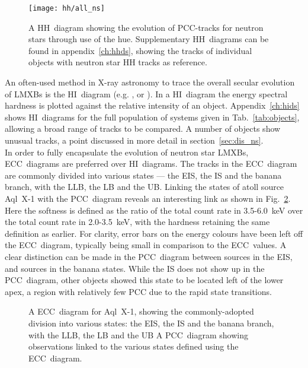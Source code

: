 \begin{figure}[p]
	\myfloatalign
	{\texttt{[image: hh/all\_ns]}}
	\caption[Neutron stars in a \acs{HH}~diagram]{A \ac{HH}~diagram showing the evolution of \ac{PCC}-tracks for neutron stars through use of the hue. Supplementary \ac{HH}~diagrams can be found in appendix~\ref{ch:hhds}, showing the tracks of individual objects with neutron star \ac{HH} tracks as reference.}\label{fig:hh_all_ns}
\end{figure}

An often-used method in X-ray astronomy to trace the overall secular evolution of \acp{LMXB} is the \ac{HI}~diagram (e.g. \citet{done2003observing}, \citet{klein2008identification} or \citet{fridriksson2015common}). In a \ac{HI}~diagram the energy spectral hardness is plotted against the relative intensity of an object. Appendix~\ref{ch:hids} shows \ac{HI}~diagrams for the full population of systems given in Tab.~\ref{tab:objects}, allowing a broad range of tracks to be compared. A number of objects show unusual tracks, a point discussed in more detail in section~\ref{sec:dis_ns}.\\

In order to fully encapsulate the evolution of neutron star \acp{LMXB}, \ac{ECC}~diagrams are preferred over \ac{HI}~diagrams. The tracks in the \ac{ECC}~diagram are commonly divided into various states --- the \ac{EIS}, the \ac{IS} and the banana branch, with the \ac{LLB}, the \ac{LB} and the \ac{UB}. Linking the states of atoll source Aql~X-1 with the \ac{PCC}~diagram reveals an interesting link as shown in Fig.~\ref{fig:cc}. Here the softness is defined as the ratio of the total count rate in 3.5-6.0~keV over the total count rate in 2.0-3.5~keV, with the hardness retaining the same definition as earlier. For clarity, error bars on the energy colours have been left off the \ac{ECC}~diagram, typically being small in comparison to the \ac{ECC}~values. A clear distinction can be made in the \ac{PCC}~diagram between sources in the \ac{EIS}, and sources in the banana states. While the \ac{IS} does not show up in the \ac{PCC}~diagram, other objects showed this state to be located left of the lower apex, a region with relatively few \ac{PCC} due to the rapid state transitions.

\begin{figure}[p]
\myfloatalign%
%
\caption[Comparing energy and power colours]{ A \ac{ECC}~diagram for Aql~X-1, showing the commonly-adopted division into various states: the \acf{EIS}, the \acf{IS} and the banana branch, with the \acf{LLB}, the \acf{LB} and the \acf{UB}  A \ac{PCC}~diagram showing observations linked to the various states defined using the \ac{ECC}~diagram.}\label{fig:cc}
\end{figure}

